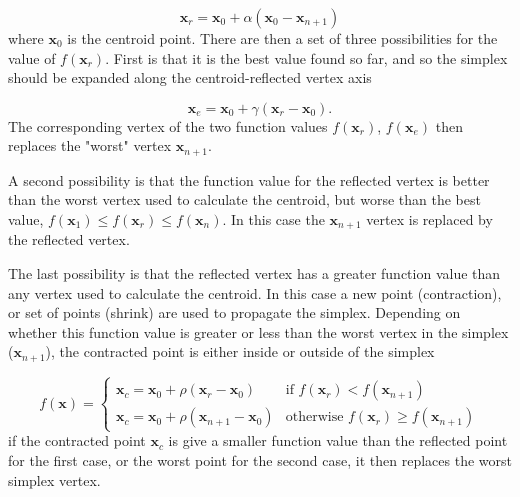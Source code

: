 \begin{equation}
\mathbf{x}_r = \mathbf{x}_0 + \alpha\left(\mathbf{x}_0 - \mathbf{x}_{n+1}\right) 
\end{equation}
%
where $\mathbf{x}_0$ is the centroid point. There are then a set of three possibilities
for the value of $f\left(\mathbf{x}_r\right)$. First is that it is the best value
found so far, and so the simplex should be expanded along the centroid-reflected 
vertex axis

\begin{equation}
\mathbf{x}_e = \mathbf{x}_0 + \gamma\left(\mathbf{x}_r - \mathbf{x}_0 \right).
\end{equation}
%
The corresponding vertex of the two function values $f\left(\mathbf{x}_r\right)$, 
$f\left(\mathbf{x}_e\right)$ then replaces the "worst" vertex $\mathbf{x}_{n+1}$.

A second possibility is that the function value for the reflected vertex is better
than the worst vertex used to calculate the centroid, but worse than the best 
value, $f\left(\mathbf{x}_1\right) \leq f\left(\mathbf{x}_r\right) \leq f\left(\mathbf{x}_n\right)$.
In this case the $\mathbf{x}_{n+1}$ vertex is replaced by the reflected vertex.

The last possibility is that the reflected vertex has a greater function value than
any vertex used to calculate the centroid. In this case a new point (contraction),
or set of points (shrink) are used to propagate the simplex. Depending on whether
this function value is greater or less than the worst vertex in the simplex ($\mathbf{x}_{n+1}$),
the contracted point is either inside or outside of the simplex

\begin{equation}
    f\left(\mathbf{x}\right)= 
    \begin{cases}
    \mathbf{x}_c = \mathbf{x}_0 + \rho \left(\mathbf{x}_r - \mathbf{x}_0 \right)               & \text{if } f\left(\mathbf{x}_r\right) < f\left(\mathbf{x}_{n+1}\right)\\
    \mathbf{x}_c = \mathbf{x}_0 + \rho \left(\mathbf{x}_{n+1} - \mathbf{x}_0 \right)           & \text{otherwise } f\left(\mathbf{x}_r\right) \geq f\left(\mathbf{x}_{n+1}\right)
    \end{cases}
\end{equation}
%
if the contracted point $\mathbf{x}_c$ is give a smaller function value than the 
reflected point for the first case, or the worst point for the second case, it then
replaces the worst simplex vertex.

